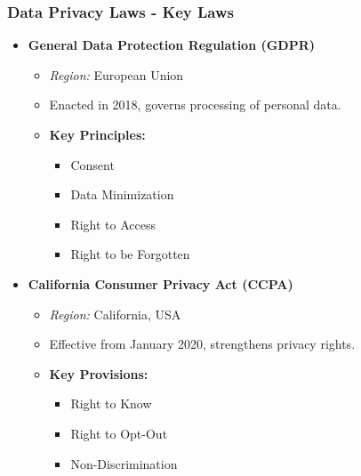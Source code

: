 \documentclass[aspectratio=169]{beamer}
\begin{document}
\begin{frame}[fragile]
    \frametitle{Data Privacy Laws - Key Laws}
    \begin{itemize}
        \item \textbf{General Data Protection Regulation (GDPR)}
        \begin{itemize}
            \item \textit{Region:} European Union
            \item Enacted in 2018, governs processing of personal data.
            \item \textbf{Key Principles:}
            \begin{itemize}
                \item Consent
                \item Data Minimization
                \item Right to Access
                \item Right to be Forgotten
            \end{itemize}
        \end{itemize}

        \item \textbf{California Consumer Privacy Act (CCPA)}
        \begin{itemize}
            \item \textit{Region:} California, USA
            \item Effective from January 2020, strengthens privacy rights.
            \item \textbf{Key Provisions:}
            \begin{itemize}
                \item Right to Know
                \item Right to Opt-Out
                \item Non-Discrimination
            \end{itemize}
        \end{itemize}
    \end{itemize}
\end{frame}
\end{document}
